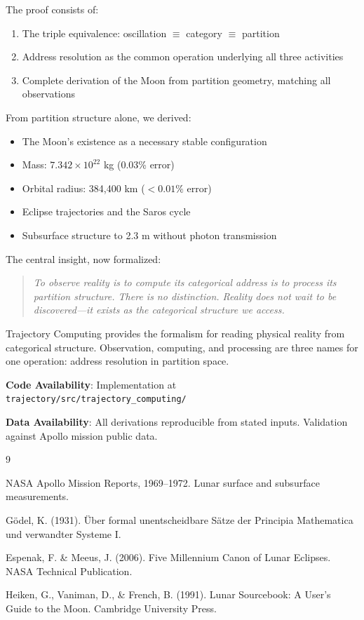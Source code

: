 \documentclass[12pt,a4paper]{article}
\theoremstyle{definition}
\theoremstyle{remark}
\begin{document}
The proof consists of:
\begin{enumerate}
    \item The triple equivalence: oscillation $\equiv$ category $\equiv$ partition
    \item Address resolution as the common operation underlying all three activities
    \item Complete derivation of the Moon from partition geometry, matching all observations
\end{enumerate}

From partition structure alone, we derived:
\begin{itemize}
    \item The Moon's existence as a necessary stable configuration
    \item Mass: $7.342 \times 10^{22}$ kg (0.03\% error)
    \item Orbital radius: 384,400 km ($<0.01\%$ error)
    \item Eclipse trajectories and the Saros cycle
    \item Subsurface structure to 2.3 m without photon transmission
\end{itemize}

The central insight, now formalized:

\begin{quote}
\emph{To observe reality is to compute its categorical address is to process its partition structure. There is no distinction. Reality does not wait to be discovered---it exists as the categorical structure we access.}
\end{quote}

Trajectory Computing provides the formalism for reading physical reality from categorical structure. Observation, computing, and processing are three names for one operation: address resolution in partition space.

\vspace{1em}
\noindent\textbf{Code Availability}: Implementation at \texttt{trajectory/src/trajectory\_computing/}

\vspace{1em}
\noindent\textbf{Data Availability}: All derivations reproducible from stated inputs. Validation against Apollo mission public data.


\begin{thebibliography}{9}

NASA Apollo Mission Reports, 1969--1972. Lunar surface and subsurface measurements.

G\"{o}del, K. (1931). \"{U}ber formal unentscheidbare S\"{a}tze der Principia Mathematica und verwandter Systeme I.

Espenak, F. \& Meeus, J. (2006). Five Millennium Canon of Lunar Eclipses. NASA Technical Publication.

Heiken, G., Vaniman, D., \& French, B. (1991). Lunar Sourcebook: A User's Guide to the Moon. Cambridge University Press.

\end{thebibliography}
\end{document}
